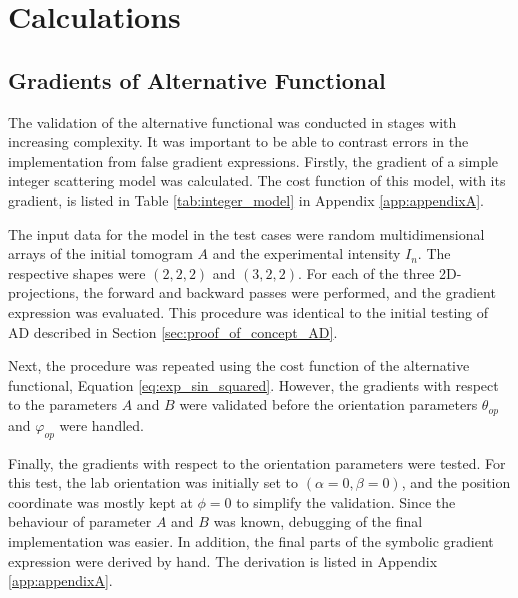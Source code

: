 
\chapter{Calculations}

\section{Gradients of Alternative Functional}\label{sec:calc_alt_functional} %

The validation of the alternative functional was conducted in stages with increasing complexity.
It was important to be able to contrast errors in the implementation from false gradient expressions.
Firstly, the gradient of a simple integer scattering model was calculated. The cost function of this model, with its gradient, is listed in Table \ref{tab:integer_model} in Appendix \ref{app:appendixA}.



The input data for the model in the test cases were random multidimensional arrays of the initial tomogram $A$ and the experimental intensity $I_{n}$.
The respective shapes were $(2,2,2)$ and $(3,2,2)$.
For each of the three 2D-projections, the forward and backward passes were performed, and the gradient expression was evaluated. %
This procedure was identical to the initial testing of AD described in Section \ref{sec:proof_of_concept_AD}.

Next, the procedure was repeated using the cost function of the alternative functional, Equation \eqref{eq:exp_sin_squared}.
However, the gradients with respect to the parameters $A$ and $B$ were validated before the orientation parameters $\theta_{op}$ and $\varphi_{op}$ were handled.


Finally, the gradients with respect to the orientation parameters were tested.
For this test, the lab orientation was initially set to $\left( \alpha = 0, \beta = 0 \right)$, and the position coordinate was mostly kept at $\phi = 0$ to simplify the validation.
Since the behaviour of parameter $A$ and $B$ was known, debugging of the final implementation was easier. %
In addition, the final parts of the symbolic gradient expression were derived by hand. The derivation is listed in Appendix \ref{app:appendixA}.



